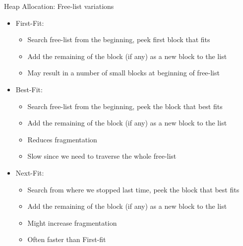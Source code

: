 \documentclass[
14pt,
aspectratio=169,
usenames,
dvipsnames,
x11names]{beamer}
\begin{document}
\begin{frame}{Heap Allocation: Free-list variations }
  \begin{itemize}  \setlength{\itemsep}{\fill}
  \item \alert{First-Fit}:
    \begin{itemize}
    \item Search free-list from the beginning, peek first block that fits
    \item Add the remaining of the block (if any) as a new block to the list
    \item May result in a number of small blocks at beginning of free-list
    \end{itemize}
  \item \alert{Best-Fit}:
    \begin{itemize}
    \item Search free-list from the beginning, peek the block that best fits
    \item Add the remaining of the block (if any) as a new block to the list
    \item Reduces fragmentation
    \item Slow since we need to traverse the whole free-list
    \end{itemize}
  \item \alert{Next-Fit}:
    \begin{itemize}
    \item Search from where we stopped last time, peek the block that best fits
    \item Add the remaining of the block (if any) as a new block to the list
    \item Might increase fragmentation
    \item Often faster than First-fit
    \end{itemize}
  \end{itemize}
\end{frame}
\end{document}
